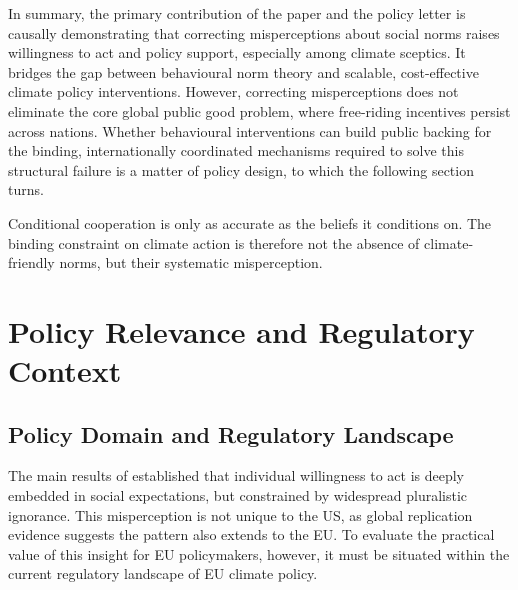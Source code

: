 \documentclass[11pt,a4paper]{scrartcl}
\numberwithin{equation}{section}
\theoremstyle{definition}
\theoremstyle{remark}
\newenvironment{keymessage}[1][Key Message]{%
  \begin{tcolorbox}[title=#1]%
}{%
  \end{tcolorbox}%
}
\begin{document}
    In summary, the primary contribution of the paper and the policy letter \parencite[][]{andre2021} is causally demonstrating that correcting misperceptions about social norms raises willingness to act and policy support, especially among climate sceptics. It bridges the gap between behavioural norm theory and scalable, cost-effective climate policy interventions. However, correcting misperceptions does not eliminate the core global public good problem, where free-riding incentives persist across nations. Whether behavioural interventions can build public backing for the binding, internationally coordinated mechanisms required to solve this structural failure is a matter of policy design, to which the following section turns.

    \begin{keymessage}
    Conditional cooperation is only as accurate as the beliefs it conditions on. The binding constraint on climate action is therefore not the absence of climate-friendly norms, but their systematic misperception.
    \end{keymessage}

\section{Policy Relevance and Regulatory Context}
\label{sec:Policy Relevance and Regulatory Context}

\subsection{Policy Domain and Regulatory Landscape}
\label{subsec:Policy Domain and Regulatory Landscape}

    The main results of \textcite{andre2024} established that individual willingness to act is deeply embedded in social expectations, but constrained by widespread pluralistic ignorance. This misperception is not unique to the US, as global replication evidence \parencite{andre2024globally} suggests the pattern also extends to the EU. To evaluate the practical value of this insight for EU policymakers, however, it must be situated within the current regulatory landscape of EU climate policy.
\end{document}
